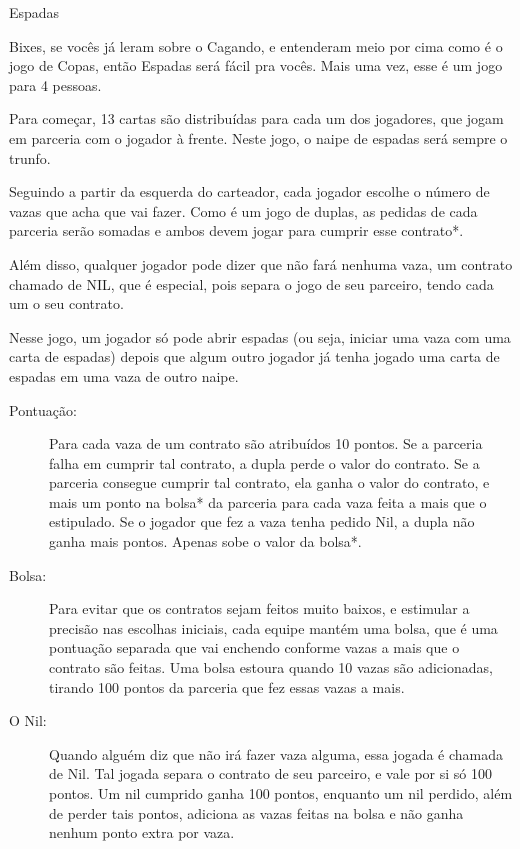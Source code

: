 \begin{subsecao}{Espadas} 

Bixes, se vocês já leram sobre o Cagando, e entenderam meio por cima como é o
jogo de Copas, então Espadas será fácil pra vocês. Mais uma vez, esse é um jogo
para 4 pessoas.

Para começar, 13 cartas são distribuídas para cada um dos jogadores, que jogam
em parceria com o jogador à frente. Neste jogo, o naipe de espadas será sempre o
trunfo.

Seguindo a partir da esquerda do carteador, cada jogador escolhe o número de
vazas que acha que vai fazer. Como é um jogo de duplas, as pedidas de cada
parceria serão somadas e ambos devem jogar para cumprir esse contrato*. 

Além disso, qualquer jogador pode dizer que não fará nenhuma vaza, um contrato
chamado de NIL, que é especial, pois separa o jogo de seu parceiro, tendo cada
um o seu contrato.

Nesse jogo, um jogador só pode abrir espadas (ou seja, iniciar uma vaza com uma
carta de espadas) depois que algum outro jogador já tenha jogado uma carta de
espadas em uma vaza de outro naipe.
\begin{description}

\item[Pontuação:]

Para cada vaza de um contrato são atribuídos 10 pontos. Se a parceria falha
em cumprir tal contrato, a dupla perde o valor do contrato. Se a parceria
consegue cumprir tal contrato, ela ganha o valor do contrato, e mais um
ponto na bolsa* da parceria para cada vaza feita a mais que o estipulado.
Se o jogador que fez a vaza tenha pedido Nil, a dupla não ganha mais
pontos. Apenas sobe o valor da bolsa*.

\item[Bolsa:]

Para evitar que os contratos sejam feitos muito baixos, e estimular a
precisão nas escolhas iniciais, cada equipe mantém uma bolsa, que é uma
pontuação separada que vai enchendo conforme vazas a mais que o contrato são
feitas. Uma bolsa estoura quando 10 vazas são adicionadas, tirando 100
pontos da parceria que fez essas vazas a mais.

\item[O Nil:]
Quando alguém diz que não irá fazer vaza alguma, essa jogada é chamada de Nil.
Tal jogada separa o contrato de seu parceiro, e vale por si só 100 pontos. Um
nil cumprido ganha 100 pontos, enquanto um nil perdido, além de perder tais
pontos, adiciona as vazas feitas na bolsa e não ganha nenhum ponto extra por
vaza.


\end{description}
\end{subsecao}
